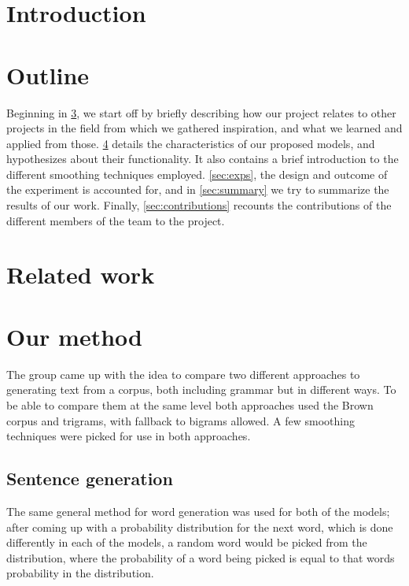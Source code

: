\documentclass[a4paper,12pt]{article}
\begin{document}
\section{Introduction} %
\label{sec:intro}





\section{Outline}
Beginning in \ref{sec:relwork}, we start off by briefly describing how our project relates to other projects in the field from which we gathered inspiration, and what we learned and applied from those. \ref{sec:method} details the characteristics of our proposed models, and hypothesizes about their functionality. It also contains a brief introduction to the different smoothing techniques employed. \ref{sec:exps}, the design and outcome of the experiment is accounted for, and in \ref{sec:summary} we try to summarize the results of our work. Finally, \ref{sec:contributions} recounts the contributions of the different members of the team to the project.


\section{Related work}
\label{sec:relwork}



\section{Our method}
\label{sec:method}

The group came up with the idea to compare two different approaches to generating text from a corpus, both including grammar but in different ways. To be able to compare them at the same level both approaches used the Brown corpus and trigrams, with fallback to bigrams allowed. A few smoothing techniques were picked for use in both approaches.

\subsection{Sentence generation}
The same general method for word generation was used for both of the models; after coming up with a probability distribution for the next word, which is done differently in each of the models, a random word would be picked from the distribution, where the probability of a word being picked is equal to that words probability in the distribution.
\end{document}
